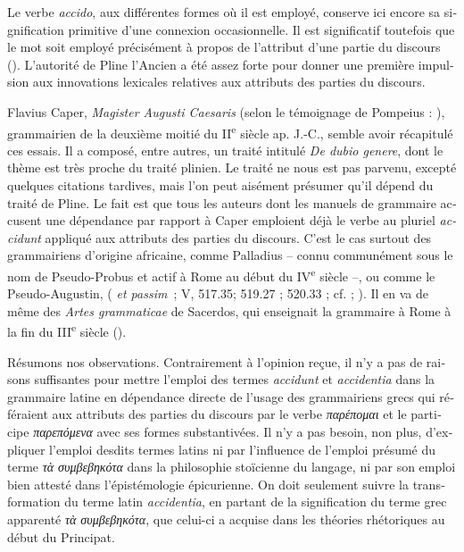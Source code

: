 \documentclass[french,output=paper,colorlinks,citecolor=brown]{../langscibook}
\begin{document}
\begin{otherlanguage}{french}
Le verbe \textit{accido}, aux différentes formes où il est employé, conserve ici encore sa signification primitive d’une connexion occasionnelle. Il est significatif toutefois que le mot soit employé précisément à propos de l’attribut d’une partie du discours (\citealt[301]{Della-Casa1969}). L’autorité de Pline l’Ancien a été assez forte pour donner une première impulsion aux innovations lexicales relatives aux attributs des parties du discours.

Flavius Caper, \textit{Magister Augusti Caesaris} (selon le témoignage de Pompeius : ), grammairien de la deuxième moitié du II\textsuperscript{e} siècle ap. J.-C., semble avoir récapitulé ces essais. Il a composé, entre autres, un traité intitulé \textit{De dubio genere}, dont le thème est très proche du traité plinien. Le traité ne nous est pas parvenu, excepté quelques citations tardives, mais l’on peut aisément présumer qu’il dépend du traité de Pline. Le fait est que tous les auteurs dont les manuels de grammaire accusent une dépendance par rapport à Caper emploient déjà le verbe au pluriel \textit{accidunt} appliqué aux attributs des parties du discours. C’est le cas surtout des grammairiens d’origine africaine, comme Palladius – connu communément sous le nom de Pseudo-Probus et actif à Rome au début du IV\textsuperscript{e} siècle –, ou comme le Pseudo-Augustin, ( \textit{et passim~}; V, 517.35; 519.27 ; 520.33 ; cf. \citealt[274]{Mazhuga2007} ; \citeyear[104]{Mazhuga2011}). Il en va de même des \textit{Artes grammaticae} de Sacerdos, qui enseignait la grammaire à Rome à la fin du III\textsuperscript{e} siècle ().

Résumons nos observations. Contrairement à l’opinion reçue, il n’y a pas de raisons suffisantes pour mettre l’emploi des termes \textit{accidunt} et \textit{accidentia} dans la grammaire latine en dépendance directe de l’usage des grammairiens grecs qui référaient aux attributs des parties du discours par le verbe \textit{παρέπομαι} et le participe \textit{παρεπόμενα} avec ses formes substantivées. Il n’y a pas besoin, non plus, d’expliquer l’emploi desdits termes latins ni par l’influence de l’emploi présumé du terme \textit{τὰ συμβεβηκότα} dans la philosophie stoïcienne du langage, ni par son emploi bien attesté dans l’épistémologie épicurienne. On doit seulement suivre la transformation du terme latin \textit{accidentia}, en partant de la signification du terme grec apparenté \textit{τὰ συμβεβηκότα}, que celui-ci a acquise dans les théories rhétoriques au début du Principat.


\end{otherlanguage}
\end{document}
